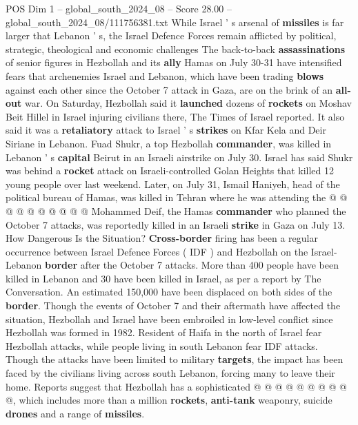 \begin{textsample}{POS Dim 1 – global\_south\_2024\_08 – Score 28.00 – global\_south\_2024\_08/111756381.txt}  \label{ex:f1_pos_020}
While Israel ' s arsenal of \textbf{missiles} is far larger that Lebanon ' s, the Israel Defence Forces remain afflicted by political, strategic, theological and economic challenges The back-to-back \textbf{assassinations} of senior figures in Hezbollah and its \textbf{ally} Hamas on July 30-31 have intensified fears that archenemies Israel and Lebanon, which have been trading \textbf{blows} against each other since the October 7 attack in Gaza, are on the brink of an \textbf{all-out} war.
On Saturday, Hezbollah said it \textbf{launched} dozens of \textbf{rockets} on Moshav Beit Hillel in Israel injuring civilians there, The Times of Israel reported.
It also said it was a \textbf{retaliatory} attack to Israel ' s \textbf{strikes} on Kfar Kela and Deir Siriane in Lebanon.
Fuad Shukr, a top Hezbollah \textbf{commander}, was killed in Lebanon ' s \textbf{capital} Beirut in an Israeli airstrike on July 30.
Israel has said Shukr was behind a \textbf{rocket} attack on Israeli-controlled Golan Heights that killed 12 young people over last weekend.
Later, on July 31, Ismail Haniyeh, head of the political bureau of Hamas, was killed in Tehran where he was attending the @ @ @ @ @ @ @ @ @ @ Mohammed Deif, the Hamas \textbf{commander} who planned the October 7 attacks, was reportedly killed in an Israeli \textbf{strike} in Gaza on July 13.
How Dangerous Is the Situation? \textbf{Cross-border} firing has been a regular occurrence between Israel Defence Forces ( IDF ) and Hezbollah on the Israel-Lebanon \textbf{border} after the October 7 attacks.
More than 400 people have been killed in Lebanon and 30 have been killed in Israel, as per a report by The Conversation.
An estimated 150,000 have been displaced on both sides of the \textbf{border}.
Though the events of October 7 and their aftermath have affected the situation, Hezbollah and Israel have been embroiled in low-level conflict since Hezbollah was formed in 1982.
Resident of Haifa in the north of Israel fear Hezbollah attacks, while people living in south Lebanon fear IDF attacks.
Though the attacks have been limited to military \textbf{targets}, the impact has been faced by the civilians living across south Lebanon, forcing many to leave their home.
Reports suggest that Hezbollah has a sophisticated @ @ @ @ @ @ @ @ @ @, which includes more than a million \textbf{rockets}, \textbf{anti-tank} weaponry, suicide \textbf{drones} and a range of \textbf{missiles}.

\end{textsample}
